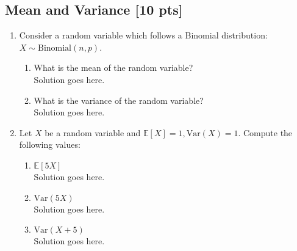 \documentclass[a4paper]{article}
\theoremstyle{definition}
\newcommand{\Var}{\mathrm{Var}}
\newenvironment{soln}{
	\leavevmode\color{blue}\ignorespaces
}{}
\begin{document}
	\subsection{Mean and Variance [10 pts]}
	\begin{enumerate}
		\item Consider a random variable which follows a Binomial
		distribution: $X \sim \text{Binomial}(n, p)$.
		\begin{enumerate}
			\item What is the mean of the random variable?\\
			\begin{soln}  Solution goes here. \end{soln}
			\item What is the variance of the random variable?\\
			\begin{soln}  Solution goes here. \end{soln}
		\end{enumerate}
		
		\item Let $X$ be a random variable and
		$\mathbb{E}[X] = 1, \Var(X) = 1$. Compute the following values:
		\begin{enumerate}
			\item $\mathbb{E}[5X]$\\
			\begin{soln}  Solution goes here. \end{soln}
			\item $\Var(5X)$\\
			\begin{soln}  Solution goes here. \end{soln}
			\item $\Var(X+5)$\\
			\begin{soln}  Solution goes here. \end{soln}
		\end{enumerate}
	\end{enumerate}
	
	
\end{document}
